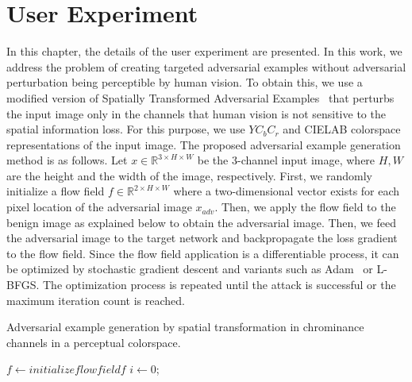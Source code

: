 \chapter{User Experiment}
\label{chp:b3}
In this chapter, the details of the user experiment are presented.
In this work, we address the problem of creating targeted adversarial examples without adversarial perturbation being perceptible by human vision. To obtain this, we use a modified version of Spatially Transformed Adversarial Examples~\cite{xiao2018spatially} that perturbs the input image only in the channels that human vision is not sensitive to the spatial information loss. For this purpose, we use \(YC_{b}C_{r}\) and CIELAB colorspace representations of the input image. The proposed adversarial example generation method is as follows. Let \(x \in \mathbb{R}^{3\times H \times W}\) be the 3-channel input image, where \(H, W\) are the height and the width of the image, respectively. First, we randomly initialize a flow field \(f \in \mathbb{R}^{2\times H \times W}\) where a two-dimensional vector exists for each pixel location of the adversarial image \(x_{adv}\). Then, we apply the flow field to the benign image as explained below to obtain the adversarial image. Then, we feed the adversarial image to the target network and backpropagate the loss gradient to the flow field. Since the flow field application is a differentiable process, it can be optimized by stochastic gradient descent and variants such as Adam~\cite{kingma2015adam} or L-BFGS\cite{liu1989limited}. The optimization process is repeated until the attack is successful or the maximum iteration count is reached.
\begin{algorithm}[t]
    \caption{Adversarial example generation by spatial transformation in chrominance channels in a perceptual colorspace. }\label{alg1}
    \(f \gets initialize flow field f\)\;
    \(i \gets 0\);

\end{algorithm}


